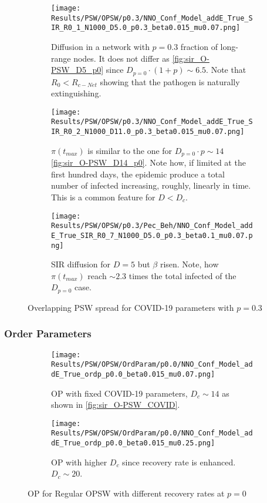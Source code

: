 \documentclass[a4paper,10pt,twoside]{book} %
\theoremstyle{definition}
\begin{document}
\begin{figure}[p]
	\centering
	\begin{subfigure}[t]{\linewidth}
		\centering
		\texttt{[image: Results/PSW/OPSW/p0.3/NNO\_Conf\_Model\_addE\_True\_SIR\_R0\_1\_N1000\_D5.0\_p0.3\_beta0.015\_mu0.07.png]}
		\caption{Diffusion in a network with $p = 0.3$ fraction of long-range nodes. It does not differ as \autoref{fig:sir_O-PSW_D5_p0} since $D_{p=0} \cdot (1+p) \sim 6.5$. Note that $R_0 < R_{c-Net}$ showing that the pathogen is naturally extinguishing.}
		\label{fig:sir_O-PSW_D5_p0.3}
	\end{subfigure}
	\begin{subfigure}[t]{\linewidth}
		\centering
		\texttt{[image: Results/PSW/OPSW/p0.3/NNO\_Conf\_Model\_addE\_True\_SIR\_R0\_2\_N1000\_D11.0\_p0.3\_beta0.015\_mu0.07.png]}
		\caption{$\pi(t_{max})$ is similar to the one for $D_{p=0} \cdot p \sim 14$ \autoref{fig:sir_O-PSW_D14_p0}. Note how, if limited at the first hundred days, the epidemic produce a total number of infected increasing, roughly, linearly in time. This is a common feature for $D < D_c$.}
		\label{fig:sir_O-PSW_D11_p0.3}
	\end{subfigure}
	\begin{subfigure}[t]{\linewidth}
		\centering
		\texttt{[image: Results/PSW/OPSW/p0.3/Pec\_Beh/NNO\_Conf\_Model\_addE\_True\_SIR\_R0\_7\_N1000\_D5.0\_p0.3\_beta0.1\_mu0.07.png]}
		\caption{SIR diffusion for $ D = 5$ but $\beta$ risen. Note, how $\pi(t_{max})$ reach $\sim 2.3$ times the total infected of the $D_{p=0}$ case.}
		\label{fig:sir_O-PSW_D5_p0.3_b0.1}
	\end{subfigure}
	\caption{Overlapping PSW spread for COVID-19 parameters with $p = 0.3$ }
\end{figure}

\clearpage
\subsubsection*{Order Parameters}
\begin{figure}[t]
	\begin{subfigure}{0.48\linewidth}
		\centering
		\texttt{[image: Results/PSW/OPSW/OrdParam/p0.0/NNO\_Conf\_Model\_addE\_True\_ordp\_p0.0\_beta0.015\_mu0.07.png]} 
		\caption{OP with fixed COVID-19 parameters, $D_c \sim 14$ as shown in \autoref{fig:sir_O-PSW_COVID}.}
		\label{fig:Ordp_OPSW_COVID-19}
	\end{subfigure}
	\begin{subfigure}{0.48\linewidth}
		\centering
		\texttt{[image: Results/PSW/OPSW/OrdParam/p0.0/NNO\_Conf\_Model\_addE\_True\_ordp\_p0.0\_beta0.015\_mu0.25.png]}
		\caption{OP with higher $D_c$ since recovery rate is enhanced. $D_c \sim 20$.}
		\label{fig:Ordp_OPSW_highmu_COVID19}
	\end{subfigure}
	\caption{OP for Regular OPSW with different recovery rates at $p = 0$ }
\end{figure}
\end{document}
